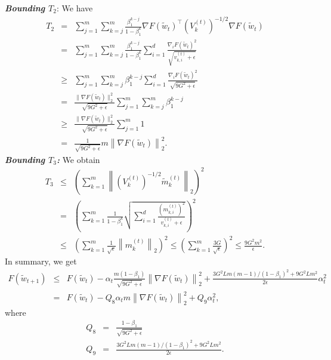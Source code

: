 \documentclass[twoside]{article}
\begin{document}
\textbf{\emph{Bounding $T_2$}}: We have
\begin{eqnarray}
\label{T2}
T_2 &=& \sum_{j=1}^{m}\sum_{k=j}^{m} \frac{\beta_1^{k-j}}{1-\beta_1^k} \nabla F(\widetilde w_t)^{\top} \left(V_k^{(t)}\right)^{-1/2} \nabla F(\widetilde w_t)\nonumber\\
&=&  \sum_{j=1}^{m}\sum_{k=j}^{m} \frac{\beta_1^{k-j}}{1-\beta_1^k} \sum_{i=1}^d \frac{\nabla_i F(\widetilde w_t)^2}{\sqrt{v_{k,i}^{(t)} + \epsilon}}\nonumber\\
&\geq& \sum_{j=1}^{m}\sum_{k=j}^{m} \beta_1^{k-j} \sum_{i=1}^d \frac{\nabla_i F(\widetilde w_t)^2 }{\sqrt{9G^2+\epsilon}}\nonumber\\
&=& \frac{\|\nabla F(\widetilde w_t)\|_2^2}{\sqrt{9G^2 + \epsilon}} \sum_{j=1}^{m}\sum_{k=j}^{m}\beta_1^{k-j}\nonumber\\
&\geq& \frac{\|\nabla F(\widetilde w_t)\|_2^2}{\sqrt{9G^2 + \epsilon}} \sum_{j=1}^{m}1\nonumber\\
&=& \frac{1}{\sqrt{9G^2 + \epsilon}} m \left\|\nabla F(\widetilde w_t)\right\|_2^2.
\end{eqnarray}
\textbf{\emph{Bounding $T_3$:}} We obtain
\begin{eqnarray}
\label{T3}
T_3 &\leq& \left(\sum_{k=1}^{m} \left\|\left(V_k^{(t)}\right)^{-1/2} \widetilde m_k^{(t)}\right\|_2\right)^2 \nonumber\\
&=&\left( \sum_{k=1}^{m}\frac{1}{1-\beta_1^k}\sqrt{\sum_{i=1}^d \frac{\left(m_{k,i}^{(t)}\right)^{2}}{v_{k,i}^{(t)}+\epsilon} }\right)^2\nonumber\\
&\leq& \left( \sum_{k=1}^{m} \frac{1}{\sqrt{\epsilon}} \left\|m_k^{(t)}\right\|_2\right)^2 \leq \left( \sum_{k=1}^{m}\frac{3G}{\sqrt{\epsilon}}\right)^2 \leq \frac{9G^2m^2}{\epsilon}.
\end{eqnarray}
In summary, we get
\begin{eqnarray}
\label{BoundDifference}
F(\widetilde w_{t+1}) &\leq &F(\widetilde w_t)- \alpha_t \frac{m(1-\beta_1)}{\sqrt{9G^2+\epsilon}} \left\|\nabla F(\widetilde w_t)\right\|_2^2 + \frac{3G^2Lm(m-1)/(1-\beta_1)^2+9G^2Lm^2}{2\epsilon} \alpha_t^2 \nonumber\\
&=& F(\widetilde w_t) - Q_8\alpha_t m \left\|\nabla F(\widetilde w_t)\right\|_2^2 + Q_9 \alpha_t^2,\nonumber
\end{eqnarray}
where
\begin{eqnarray}
Q_8 &=& \frac{1-\beta_1}{\sqrt{9G^2+\epsilon}}\nonumber\\
Q_9 &=& \frac{3G^2Lm(m-1)/(1-\beta_1)^2+9G^2Lm^2}{2\epsilon}.\nonumber
\end{eqnarray}
\end{document}
